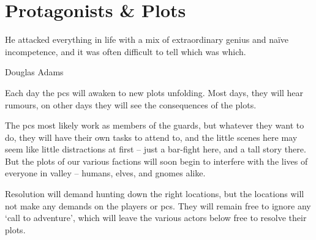 \chapter{Protagonists \& Plots}
  \epigraph{He attacked everything in life with a mix of extraordinary genius and na\"ive incompetence, and it was often difficult to tell which was which.}{Douglas Adams}
\label{sideQuestIntro}

\noindent
Each day the \glspl{pc} will awaken to new plots unfolding.
Most days, they will hear rumours, on other days they will see the consequences of the plots.

The \glspl{pc} most likely work as members of the \glspl{guard}, but whatever they want to do, they will have their own tasks to attend to, and the little scenes here may seem like little distractions at first -- just a bar-fight here, and a tall story there.
But the plots of our various factions will soon begin to interfere with the lives of everyone in \gls{valley} -- humans, elves, and gnomes alike.

Resolution will demand hunting down the right locations, but the locations will not make any demands on the players or \glspl{pc}.
They will remain free to ignore any `call to adventure', which will leave the various actors below free to resolve their plots.


\printglossary[
  type=people,
  style=topicmcols,
]

\renewcommand\csComments{
  \mapCircle{-4,3.4}{2}{Dyson_Logos/forgotten_city}
  \mapCircle{-5.6,-2.8}{2}{Dyson_Logos/qualme_temple}
  \mapCircle[4]{1.1,0.1}{2.5}{Dyson_Logos/town}
  \mapCircle{6.1,-3.6}{1.7}{Dyson_Logos/shadow_gate}
  \mapCircle{-1,-0.4}{2}{Dyson_Logos/redfall}
  \mapCircle{6.3,-0.1}{1.7}{Dyson_Logos/lakeside}
  \mapCircle{-6.3,2.3}{1.7}{Dyson_Logos/bandit_camp}
}


\bigLine

